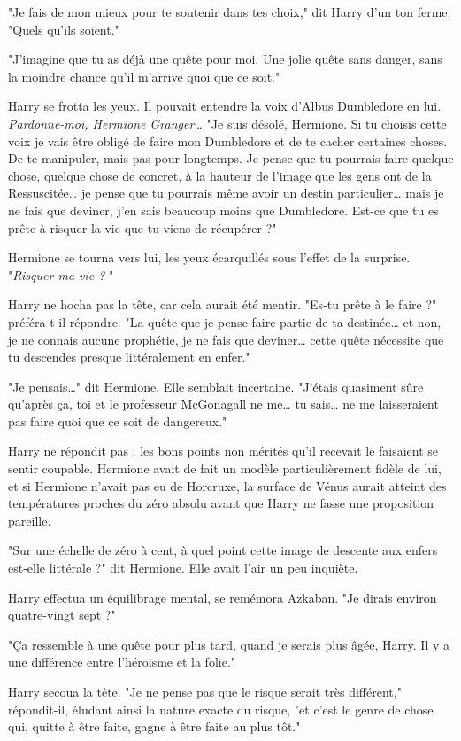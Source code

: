 "Je fais de mon mieux pour te soutenir dans tes choix," dit Harry d'un ton ferme. "Quels qu'ils soient."

"J'imagine que tu as déjà une quête pour moi. Une jolie quête sans danger, sans la moindre chance qu'il m'arrive quoi que ce soit."

Harry se frotta les yeux. Il pouvait entendre la voix d'Albus Dumbledore en lui. \emph{Pardonne-moi, Hermione Granger…}  "Je suis désolé, Hermione. Si tu choisis cette voix je vais être obligé de faire mon Dumbledore et de te cacher certaines choses. De te manipuler, mais pas pour longtemps. Je pense que tu pourrais faire quelque chose, quelque chose de concret, à la hauteur de l'image que les gens ont de la Ressuscitée… je pense que tu pourrais même avoir un destin particulier… mais je ne fais que deviner, j'en sais beaucoup moins que Dumbledore. Est-ce que tu es prête à risquer la vie que tu viens de récupérer ?"

Hermione se tourna vers lui, les yeux écarquillés sous l'effet de la surprise. "\emph{Risquer ma vie ?} "

Harry ne hocha pas la tête, car cela aurait été mentir. "Es-tu prête à le faire ?" préféra-t-il répondre. "La quête que je pense faire partie de ta destinée… et non, je ne connais aucune prophétie, je ne fais que deviner… cette quête nécessite que tu descendes presque littéralement en enfer."

"Je pensais…" dit Hermione. Elle semblait incertaine. "J'étais quasiment sûre qu'après ça, toi et le professeur McGonagall ne me… tu sais… ne me laisseraient pas faire quoi que ce soit de dangereux."

Harry ne répondit pas ; les bons points non mérités qu'il recevait le faisaient se sentir coupable. Hermione avait de fait un modèle particulièrement fidèle de lui, et si Hermione n'avait pas eu de Horcruxe, la surface de Vénus aurait atteint des températures proches du zéro absolu avant que Harry ne fasse une proposition pareille.

"Sur une échelle de zéro à cent, à quel point cette image de descente aux enfers est-elle littérale ?" dit Hermione. Elle avait l'air un peu inquiète.

Harry effectua un équilibrage mental, se remémora Azkaban. "Je dirais environ quatre-vingt sept ?"

"Ça ressemble à une quête pour plus tard, quand je serais plus âgée, Harry. Il y a une différence entre l'héroïsme et la folie."

Harry secoua la tête. "Je ne pense pas que le risque serait très différent," répondit-il, éludant ainsi la nature exacte du risque, "et c'est le genre de chose qui, quitte à être faite, gagne à être faite au plus tôt."

